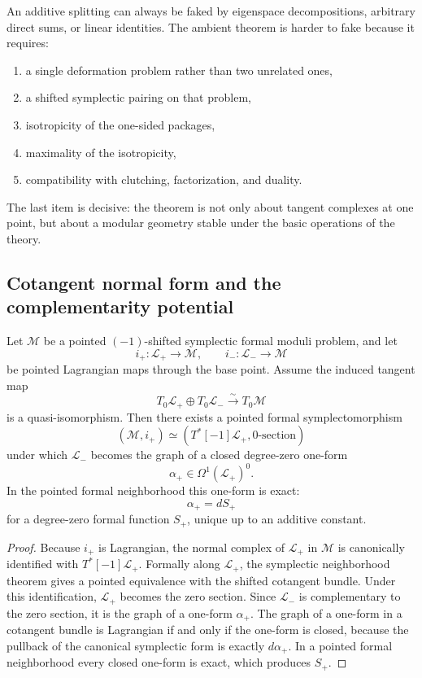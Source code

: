 \begin{remark}
\label{rem:nms-stronger-than-additive}
An additive splitting can always be faked by eigenspace decompositions, arbitrary direct sums, or linear identities. The ambient theorem is harder to fake because it requires:
\begin{enumerate}[label=\textup{(\roman*)}]
\item a single deformation problem rather than two unrelated ones,
\item a shifted symplectic pairing on that problem,
\item isotropicity of the one-sided packages,
\item maximality of the isotropicity,
\item compatibility with clutching, factorization, and duality.
\end{enumerate}
The last item is decisive: the theorem is not only about tangent complexes at one point, but about a modular geometry stable under the basic operations of the theory.
\end{remark}

\subsection{Cotangent normal form and the complementarity potential}
\label{subsec:nms-cotangent-normal-form}

\begin{theorem}
\label{thm:nms-cotangent-normal-form}
Let $\mathcal M$ be a pointed $(-1)$-shifted symplectic formal moduli problem, and let
\[
i_+\colon \mathcal L_+\to \mathcal M,
\qquad
 i_-\colon \mathcal L_-\to \mathcal M
\]
be pointed Lagrangian maps through the base point. Assume the induced tangent map
\[
T_0\mathcal L_+\oplus T_0\mathcal L_- \xrightarrow{\sim} T_0\mathcal M
\]
is a quasi-isomorphism. Then there exists a pointed formal symplectomorphism
\[
(\mathcal M,i_+)\simeq (T^*[-1]\mathcal L_+,0\text{-section})
\]
under which $\mathcal L_-$ becomes the graph of a closed degree-zero one-form
\[
\alpha_+\in \Omega^1(\mathcal L_+)^0.
\]
In the pointed formal neighborhood this one-form is exact:
\[
\alpha_+=dS_+
\]
for a degree-zero formal function $S_+$, unique up to an additive constant.
\end{theorem}

\begin{proof}
Because $i_+$ is Lagrangian, the normal complex of $\mathcal L_+$ in $\mathcal M$ is canonically identified with $T^*[-1]\mathcal L_+$. Formally along $\mathcal L_+$, the symplectic neighborhood theorem gives a pointed equivalence with the shifted cotangent bundle. Under this identification, $\mathcal L_+$ becomes the zero section. Since $\mathcal L_-$ is complementary to the zero section, it is the graph of a one-form $\alpha_+$. The graph of a one-form in a cotangent bundle is Lagrangian if and only if the one-form is closed, because the pullback of the canonical symplectic form is exactly $d\alpha_+$. In a pointed formal neighborhood every closed one-form is exact, which produces $S_+$.\qedhere
\end{proof}

